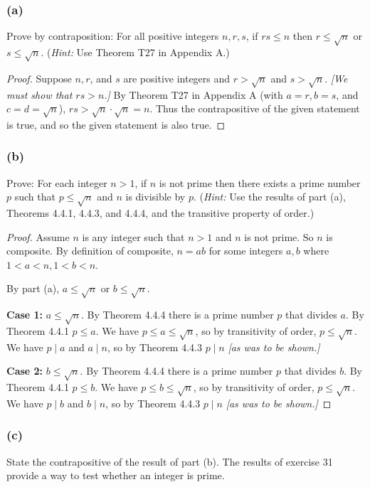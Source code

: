 \documentclass[14pt]{extarticle}
\begin{document}
\subsubsection{(a)}
Prove by contraposition: For all positive integers $n, r, s$, if $rs \leq n$ then $r \leq \sqrt{n}$ or $s \leq \sqrt{n}$. ({\it Hint:} Use Theorem T27 in Appendix A.)

\begin{proof}
Suppose $n, r$, and $s$ are positive integers and $r > \sqrt{n}$ and $s > \sqrt{n}$. {\it [We must show that $rs > n$.]} By Theorem T27 in Appendix A (with $a = r, b = s$, and $c = d = \sqrt{n}$), $rs > \sqrt{n}\cdot\sqrt{n} = n$. Thus the contrapositive of the given statement is true, and so the given statement is also true.
\end{proof}

\subsubsection{(b)}
Prove: For each integer $n > 1$, if $n$ is not prime then there exists a prime number $p$ such that $p \leq \sqrt{n}$ and $n$ is divisible by $p$. ({\it Hint:} Use the results of part (a), Theorems 4.4.1, 4.4.3, and 4.4.4, and the transitive property of order.)

\begin{proof}
Assume $n$ is any integer such that $n > 1$ and $n$ is not prime. So $n$ is composite. By definition of composite, $n = ab$ for some integers $a,b$ where $1 < a < n, 1 < b < n$.

By part (a), $a \leq \sqrt{n}$ or $b \leq \sqrt{n}$.

{\bf Case 1:} $a \leq \sqrt{n}$. By Theorem 4.4.4 there is a prime number $p$ that divides $a$. By Theorem 4.4.1 $p \leq a$. We have $p \leq a \leq \sqrt{n}$, so by transitivity of order, $p \leq \sqrt{n}$. We have $p \mid a$ and $a \mid n$, so by Theorem 4.4.3 $p \mid n$ {\it [as was to be shown.]}

{\bf Case 2:} $b \leq \sqrt{n}$. By Theorem 4.4.4 there is a prime number $p$ that divides $b$. By Theorem 4.4.1 $p \leq b$. We have $p \leq b \leq \sqrt{n}$, so by transitivity of order, $p \leq \sqrt{n}$. We have $p \mid b$ and $b \mid n$, so by Theorem 4.4.3 $p \mid n$ {\it [as was to be shown.]}
\end{proof}

\subsubsection{(c)}
State the contrapositive of the result of part (b). The results of exercise 31 provide a way to test whether an integer is prime.
\end{document}
